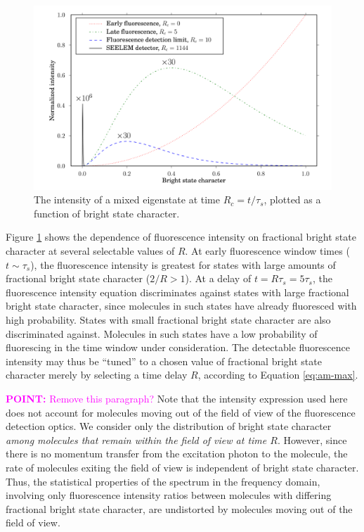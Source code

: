 \documentclass[12pt,draft]{mitthesis}
\newcommand{\POINT}[1]{\textcolor{magenta}{\textbf{POINT:} #1}}
\begin{document}
\begin{figure}
  \caption{The intensity of a mixed eigenstate at time $R_c =
    t/\tau_s$, plotted as a function of bright
    state character.}
  \label{fig:int-at-rc}
  \centering
  \includegraphics[width=7.5in,angle=90]{intensity-at-rc.png}
\end{figure}

Figure \ref{fig:int-at-rc} shows the dependence of fluorescence
intensity on fractional bright state character at several selectable
values of $R$.  At early fluorescence window times ($t \sim \tau_s$),
the fluorescence intensity is greatest for states with large amounts
of fractional bright state character ($2/R > 1$).  At a delay of $t =
R \tau_s = 5 \tau_s$, the fluorescence intensity equation
discriminates against states with large fractional bright state
character, since molecules in such states have already fluoresced with
high probability.  States with small fractional bright state character
are also discriminated against.  Molecules in such states have a low
probability of fluorescing in the time window under consideration.
The detectable fluorescence intensity may thus be ``tuned'' to a
chosen value of fractional bright state character merely by selecting
a time delay $R$, according to Equation \ref{eq:am-max}.

\POINT{Remove this paragraph?}  Note that the intensity expression
used here does not account for molecules moving out of the field of
view of the fluorescence detection optics.  We consider only the
distribution of bright state character \emph{among molecules that
  remain within the field of view at time $R$}.  However, since there
is no momentum transfer from the excitation photon to the molecule,
the rate of molecules exiting the field of view is independent of
bright state character.  Thus, the statistical properties of the
spectrum in the frequency domain, involving only fluorescence
intensity ratios between molecules with differing fractional bright
state character, are undistorted by molecules moving out of the field
of view.
\end{document}
